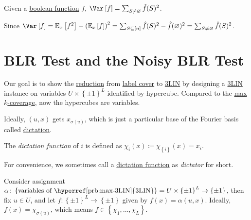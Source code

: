 \begin{claim}
	Given a \hyperref[def:boolean-function]{boolean function} \(f\), \(\Var_{}\left[f \right] = \sum_{S \neq \varnothing } \hat{f} (S)^{2}  \).
\end{claim}
\begin{explanation}
	Since \(\Var_{}\left[f \right]
	= \mathbb{E}_{x}\left[f^2 \right] - \left( \mathbb{E}_{x}\left[f \right]  \right) ^2
	= \sum_{S \subseteq [n]} \hat{f} (S)^2 - \hat{f} (\varnothing )^2
	= \sum_{S \neq \varnothing } \hat{f} (S)^2\).
\end{explanation}

\section{BLR Test and the Noisy BLR Test}
Our goal is to show the \hyperref[def:reduction]{reduction} from \hyperref[prb:label-cover]{label cover} to \hyperref[prb:max-3LIN]{3LIN} by designing a \hyperref[prb:max-3LIN]{3LIN} instance on variables \(U \times \left\{ \pm 1 \right\} ^L\) identified by hypercube. Compared to the \hyperref[prb:max-k-coverage]{max \(k\)-coverage}, now the hypercubes are variables.
\begin{center}
\end{center}

Ideally, \((u, x)\) gets \(x_{\sigma (u)}\), which is just a particular base of the Fourier basis called \hyperref[def:dictation]{dictation}.

\begin{definition}[Dictation]\label{def:dictation}
	The \emph{dictation function} of \(i\) is defined as \(\chi _i(x) \coloneqq \chi _{\left\{ i \right\} } (x) = x_i\).
\end{definition}

For convenience, we sometimes call a \hyperref[def:dictation]{dictation function} as \emph{dictator} for short.

\begin{intuition}
	Consider assignment \(\alpha \colon \left\{ \text{variables of \hyperref[prb:max-3LIN]{3LIN}}\right\} = U \times \left\{ \pm 1 \right\}^L \to \left\{ \pm 1 \right\} \), then fix \(u\in U\), and let \(f\colon \left\{ \pm 1 \right\} ^L \to  \left\{ \pm 1 \right\} \) given by \(f(x) = \alpha (u, x)\). Ideally, \(f(x) = \chi _{\sigma (u)}\), which means \(f\in \left\{ \chi _1, \dots , \chi _L  \right\} \).
\end{intuition}

